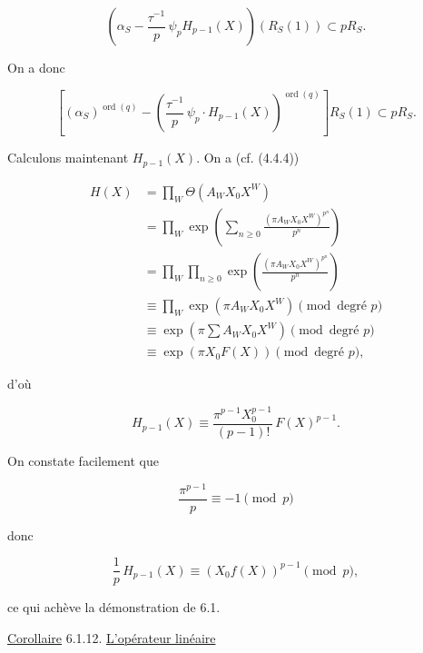 \begin{equation}\tag{6.1.6}
\left(
\alpha_S-\frac{\tau^{-1}}p\,\psi_pH_{p-1}(X)
\right)(R_S(1))
\subset pR_S.
\end{equation}

On a donc

\begin{equation}\tag{6.1.7}
\left[
(\alpha_S)^{\operatorname{ord}(q)}
-
\left(
\frac{\tau^{-1}}p\,\psi_p\cdot H_{p-1}(X)
\right)^{\operatorname{ord}(q)}
\right]R_S(1)
\subset pR_S.
\end{equation}

Calculons maintenant $H_{p-1}(X)$. On a (cf. (4.4.4))


\begin{equation}\tag{6.1.8}
\begin{aligned}
H(X)
&=\prod_W\Theta(A_WX_0X^W)\\
&=\prod_W\exp\!\left(
\sum_{n\geq0}\frac{(\pi A_WX_0X^W)^{p^n}}{p^n}
\right)\\
&=\prod_W\prod_{n\geq0}
\exp\!\left(\frac{(\pi A_WX_0X^W)^{p^n}}{p^n}\right)\\
&\equiv\prod_W\exp(\pi A_WX_0X^W)
\pmod{\text{degré }p}\\
&\equiv\exp\!\left(\pi\sum A_WX_0X^W\right)
\pmod{\text{degré }p}\\
&\equiv\exp(\pi X_0F(X))
\pmod{\text{degré }p},
\end{aligned}
\end{equation}

d'où

\begin{equation}\tag{6.1.9}
H_{p-1}(X)
\equiv\frac{\pi^{p-1}X_0^{p-1}}{(p-1)!}\,F(X)^{p-1}.
\end{equation}

On constate facilement que

\begin{equation}\tag{6.1.10}
\frac{\pi^{p-1}}p\equiv-1\pmod p
\end{equation}

donc

\begin{equation}\tag{6.1.11}
\frac1p\,H_{p-1}(X)
\equiv(X_0f(X))^{p-1}\pmod p,
\end{equation}

ce qui achève la démonstration de 6.1.

\underline{Corollaire} 6.1.12.
\underline{L'opérateur linéaire}

